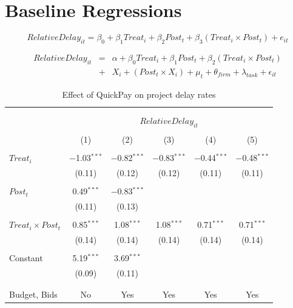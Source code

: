 \documentclass[
]{article}
\begin{document}
\hypertarget{baseline-regressions}{%
\section{Baseline Regressions}\label{baseline-regressions}}

\[ RelativeDelay_{it} = \beta_0 + \beta_1 Treat_i + \beta_2 Post_t + \beta_3 (Treat_i \times Post_t) + e_{it}\]

\[ \begin{aligned} RelativeDelay_{it} &=& \alpha+\beta_0 Treat_i + \beta_1 Post_t + \beta_2 (Treat_i \times Post_t)\\
&+&  X_i + (Post_t \times X_i) + \mu_t + \theta_{firm} + \lambda_{task}+ \epsilon_{it}
\end{aligned}\]

\begin{table}[H] \centering 
  \caption{Effect of QuickPay on project delay rates} 
  \label{} 
\small 
\begin{tabular}{@{\extracolsep{-2pt}}lccccc} 
\\[-1.8ex]\hline 
\hline \\[-1.8ex] 
\\[-1.8ex] & \multicolumn{5}{c}{$RelativeDelay_{it}$} \\ 
\\[-1.8ex] & (1) & (2) & (3) & (4) & (5)\\ 
\hline \\[-1.8ex] 
 $Treat_i$ & $-$1.03$^{***}$ & $-$0.82$^{***}$ & $-$0.83$^{***}$ & $-$0.44$^{***}$ & $-$0.48$^{***}$ \\ 
  & (0.11) & (0.12) & (0.12) & (0.11) & (0.11) \\ 
  & & & & & \\ 
 $Post_t$ & 0.49$^{***}$ & $-$0.83$^{***}$ &  &  &  \\ 
  & (0.11) & (0.13) &  &  &  \\ 
  & & & & & \\ 
 $Treat_i \times Post_t$ & 0.85$^{***}$ & 1.08$^{***}$ & 1.08$^{***}$ & 0.71$^{***}$ & 0.71$^{***}$ \\ 
  & (0.14) & (0.14) & (0.14) & (0.14) & (0.14) \\ 
  & & & & & \\ 
 Constant & 5.19$^{***}$ & 3.69$^{***}$ &  &  &  \\ 
  & (0.09) & (0.11) &  &  &  \\ 
  & & & & & \\ 
\hline \\[-1.8ex] 
Budget, Bids & No & Yes & Yes & Yes & Yes \\ 

\end{tabular}
\end{table}
\end{document}
